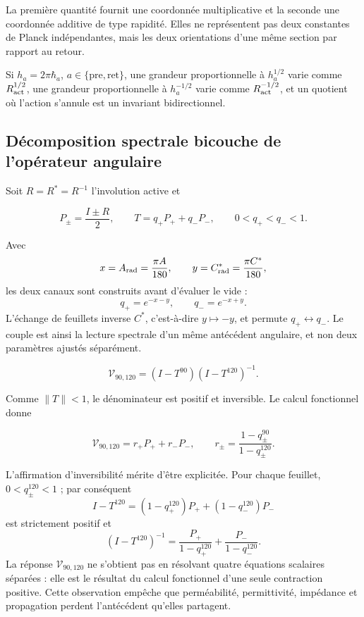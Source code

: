 La première quantité fournit une coordonnée multiplicative et la seconde
une coordonnée additive de type rapidité. Elles ne représentent pas deux constantes de
Planck indépendantes, mais les deux orientations d'une même section
par rapport au retour.

Si \(h_a=2\pi\hbar_a\), \(a\in\{\mathrm{pre},\mathrm{ret}\}\), une grandeur proportionnelle à \(h_a^{1/2}\) varie comme \(R_{\rm act}^{1/2}\), une grandeur proportionnelle à \(h_a^{-1/2}\) varie comme \(R_{\rm act}^{-1/2}\), et un quotient où l'action s'annule est un invariant bidirectionnel.

\subsection{Décomposition spectrale bicouche de l'opérateur angulaire}

Soit \(R=R^*=R^{-1}\) l'involution active et

\[
P_\pm=\frac{I\pm R}{2},
\qquad
T=q_+P_+ +q_-P_-,
\qquad 0<q_+<q_-<1.
\]

Avec
\[
x=A_{\rm rad}=\frac{\pi A}{180},\qquad
y=C^*_{\rm rad}=\frac{\pi C^*}{180},
\]
les deux canaux sont construits avant d'évaluer le vide :
\begin{equation}
q_+=e^{-x-y},\qquad q_-=e^{-x+y}.
\label{rm:eq:vacuum-angular-channels}
\end{equation}
L'échange de feuillets inverse \(C^*\), c'est-à-dire \(y\mapsto-y\), et permute \(q_+\leftrightarrow q_-\). Le couple est ainsi la lecture spectrale d'un même antécédent angulaire, et non deux paramètres ajustés séparément.

\begin{definition}
\begin{equation}
\mathcal V_{90,120}=(I-T^{90})(I-T^{120})^{-1}.
\label{rm:eq:vacuum-operator}
\end{equation}
\end{definition}

Comme \(\|T\|<1\), le dénominateur est positif et inversible. Le calcul fonctionnel donne

\begin{equation}
\mathcal V_{90,120}=r_+P_+ +r_-P_-,
\qquad
r_\pm=\frac{1-q_\pm^{90}}{1-q_\pm^{120}}.
\label{rm:eq:vacuum-eigenvalues}
\end{equation}

L'affirmation d'inversibilité mérite d'être explicitée. Pour chaque feuillet,
\(0<q_\pm^{120}<1\) ; par conséquent
\[
I-T^{120}=(1-q_+^{120})P_++(1-q_-^{120})P_-
\]
est strictement positif et
\[
(I-T^{120})^{-1}
=\frac{P_+}{1-q_+^{120}}+
 \frac{P_-}{1-q_-^{120}}.
\]
La réponse \(\mathcal V_{90,120}\) ne s'obtient pas en résolvant quatre
équations scalaires séparées : elle est le résultat du calcul fonctionnel d'une
seule contraction positive. Cette observation empêche que perméabilité,
permittivité, impédance et propagation perdent l'antécédent qu'elles partagent.

